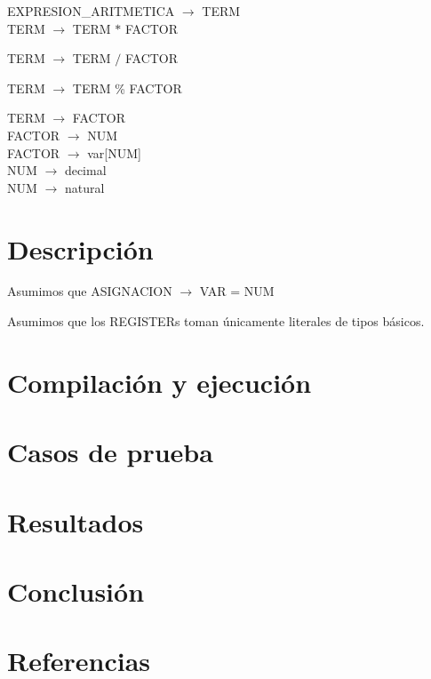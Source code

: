 \documentclass[10pt,a4paper]{article}
\begin{document}
EXPRESION\_ARITMETICA $\rightarrow$ TERM \\

TERM $\rightarrow$ TERM $*$ FACTOR   

TERM $\rightarrow$ TERM $/$ FACTOR   

TERM $\rightarrow$ TERM \% FACTOR  

TERM $\rightarrow$ FACTOR \\

FACTOR $\rightarrow$ NUM   \\

FACTOR $\rightarrow$ var[NUM]  \\ 

NUM $\rightarrow$ decimal \\

NUM $\rightarrow$ natural





\section{Descripción}

Asumimos que ASIGNACION $\rightarrow$ VAR = NUM 

Asumimos que los REGISTERs toman únicamente literales de tipos básicos.

\section{Compilación y ejecución}

\section{Casos de prueba}

\section{Resultados}

\section{Conclusión}

\section{Referencias}
\end{document}
